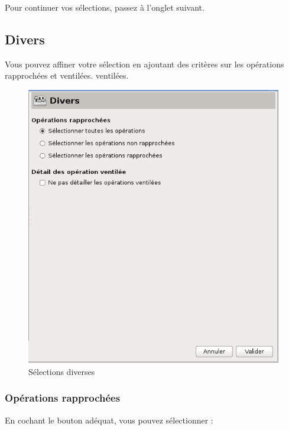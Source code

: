 Pour continuer vos sélections, passez à l'onglet suivant.


\subsection{Divers\label{reportscreation-selection-misc}}

Vous pouvez affiner votre sélection en ajoutant des critères sur les opérations rapprochées et \ifIllustration ventilées.
\else ventilées.
\fi

\ifIllustration
\begin{figure}[htbp]
\begin{center}
\includegraphics[scale=0.5]{image/screenshot/reportcreation_datas_misc}
\end{center}
\caption{Sélections diverses}
\label{reportcreation-datas-misc-img}
\end{figure}
\fi


\subsubsection{Opérations rapprochées}

En cochant le bouton adéquat, vous pouvez sélectionner :


